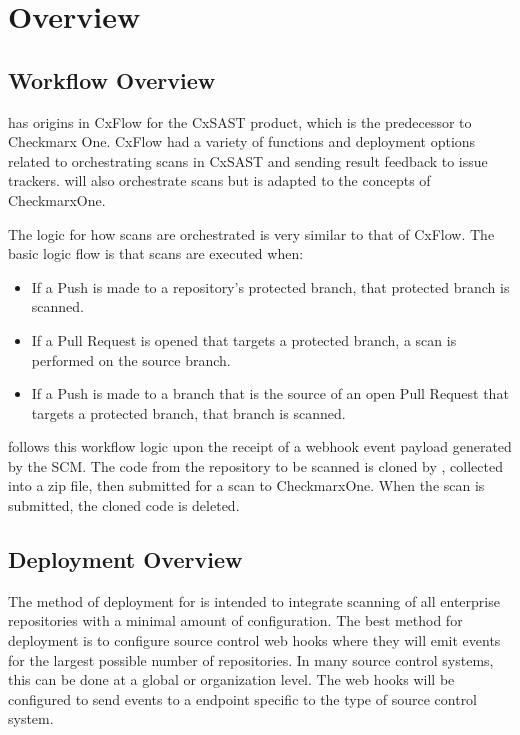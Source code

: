 \chapter{Overview}\label{sec:overview}

\section{Workflow Overview}

\cxoneflow has origins in CxFlow for the CxSAST product, which is the predecessor to Checkmarx One.  CxFlow
had a variety of functions and deployment options related to orchestrating scans in CxSAST and sending
result feedback to issue trackers.  \cxoneflow will also orchestrate scans but is adapted to the
concepts of CheckmarxOne.

The \cxoneflow logic for how scans are orchestrated is very similar to that of CxFlow.  The basic
logic flow is that scans are executed when:

\begin{itemize}
    \item If a Push is made to a repository's protected branch, that protected branch is scanned.
    \item If a Pull Request is opened that targets a protected branch, a scan is performed on
    the source branch.
    \item If a Push is made to a branch that is the source of an open Pull Request that targets
    a protected branch, that branch is scanned.
\end{itemize}


\cxoneflow follows this workflow logic upon the receipt of a webhook event payload generated by the SCM.
The code from the repository to be scanned is cloned by \cxoneflow, collected into a zip file, then submitted
for a scan to CheckmarxOne.  When the scan is submitted, the cloned code is deleted.


\section{Deployment Overview}

The method of deployment for \cxoneflow is intended to integrate scanning of all enterprise repositories
with a minimal amount of configuration.  The best method for deployment is to configure source control web
hooks where they will emit events for the largest possible number of repositories.  In many source control
systems, this can be done at a global or organization level.  The web hooks will be configured to send events
to a \cxoneflow endpoint specific to the type of source control system.

